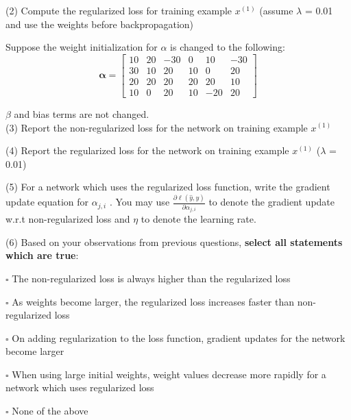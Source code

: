 (2) Compute the regularized loss for training example $x^{(1)}$ (assume $\lambda$ = 0.01 and use the weights before backpropagation)
\begin{tcolorbox}[fit,height=1cm, width=2cm, blank, borderline={1pt}{-2pt}]

\end{tcolorbox}

Suppose the weight initialization for $\alpha$ is changed to the following:
$$\boldsymbol{\alpha}=
\begin{bmatrix}
10 & 20 & -30 & 0 & 10 & -30 \\
30 & 10 & 20 & 10 & 0 & 20 \\
20 & 20 & 20 & 20 & 20 & 10 \\
10 & 0 & 20 & 10 & -20 & 20
\end{bmatrix}$$

$\beta$ and bias terms are not changed. \\

(3) Report the non-regularized loss for the network on training example $x^{(1)}$
\begin{tcolorbox}[fit,height=1cm, width=2cm, blank, borderline={1pt}{-2pt}]

\end{tcolorbox}

(4) Report the regularized loss for the network on training example $x^{(1)}$ ($\lambda$ = 0.01)
\begin{tcolorbox}[fit,height=1cm, width=2cm, blank, borderline={1pt}{-2pt}]

\end{tcolorbox}

(5) For a network which uses the regularized loss function, write the gradient update equation for $\alpha_{j,i}$ . You may use $\frac{\partial \ell(\hat{y},y)}{\partial \alpha_{j,i}}$ to denote the gradient update w.r.t non-regularized loss and $\eta$ to denote the learning rate.
\begin{tcolorbox}[fit,height=3cm, width=10cm, blank, borderline={1pt}{-2pt}]

\end{tcolorbox}

(6) Based on your observations from previous questions, \textbf{select all statements which are true}:
\begin{list}{}
    \item $\square$ The non-regularized loss is always higher than the regularized loss
    \item $\square$ As weights become larger, the regularized loss increases faster than non-regularized loss
    \item $\square$ On adding regularization to the loss function, gradient updates for the network become larger
    \item $\square$ When using large initial weights, weight values decrease more rapidly for a network which uses regularized loss
    \item $\square$ None of the above
\end{list}
